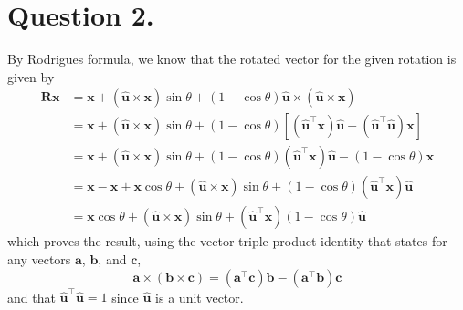 \documentclass[10pt]{article}
\newcommand{\unit}[1]{\mathbf{\hat{#1}}}
\begin{document}
    \section*{\textbf{Question 2.}}
    By Rodrigues formula, we know that the rotated vector for the given rotation is
    given by
    \begin{align*}
        \mathbf{R} \mathbf{x} &= \mathbf{x} + (\unit{u} \times \mathbf{x}) \sin{\theta}
        + (1 - \cos{\theta}) \unit{u} \times (\unit{u} \times \mathbf{x}) \\
        &= \mathbf{x} + (\unit{u} \times \mathbf{x}) \sin{\theta}
        + (1 - \cos{\theta}) \left[ (\unit{u}^{\top} \mathbf{x}) \unit{u} - (\unit{u}^{\top}
        \unit{u}) \mathbf{x} \right] \\
        &= \mathbf{x} + (\unit{u} \times \mathbf{x}) \sin{\theta}
        + (1 - \cos{\theta}) (\unit{u}^{\top} \mathbf{x}) \unit{u} - (1 - \cos{\theta})
        \mathbf{x} \\
        &= \mathbf{x} - \mathbf{x} + \mathbf{x} \cos{\theta} + (\unit{u} \times \mathbf{x})
        \sin{\theta} + (1 - \cos{\theta}) (\unit{u}^{\top} \mathbf{x}) \unit{u} \\
        &= \mathbf{x} \cos{\theta} + (\unit{u} \times \mathbf{x}) \sin{\theta}
        + (\unit{u}^{\top} \mathbf{x}) (1 - \cos{\theta}) \unit{u} \tag*{$\square$}
    \end{align*}
    which proves the result, using the vector triple product identity that states
    for any vectors $\mathbf{a}$, $\mathbf{b}$, and $\mathbf{c}$,
    \begin{equation*}
        \mathbf{a} \times (\mathbf{b} \times \mathbf{c}) = (\mathbf{a}^{\top} \mathbf{c})
        \mathbf{b} - (\mathbf{a}^{\top} \mathbf{b}) \mathbf{c}
    \end{equation*}
    and that $\unit{u}^{\top} \unit{u} = 1$ since $\unit{u}$ is a unit vector.
\end{document}
